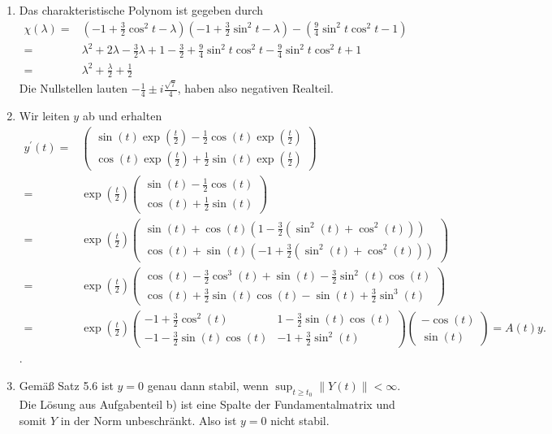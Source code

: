 \begin{solution}
\begin{enumerate}[label = \textbf{\alph*)}]
  \item Das charakteristische Polynom ist gegeben durch
  \begin{align*}
    \chi (\lambda) =& (-1 + \frac{3}{2}\cos^2 t - \lambda)(-1 + \frac{3}{2}\sin^2 t - \lambda) - (\frac{9}{4}\sin^2 t \cos^2 t - 1) \\
    =& \lambda^2 +2\lambda - \frac{3}{2} \lambda + 1 - \frac{3}{2} + \frac{9}{4}\sin^2 t \cos^2 t - \frac{9}{4} \sin^{2} t \cos^2 t + 1 \\
    =& \lambda^2 + \frac{\lambda}{2} + \frac{1}{2}
  \end{align*}
  Die Nullstellen lauten $- \frac{1}{4} \pm i\frac{\sqrt{7}}{4}$, haben also negativen Realteil.
  \item Wir leiten $y$ ab und erhalten
  \begin{align*}
    y^{\prime}(t) =& \begin{pmatrix}
      \sin(t)\exp(\frac{t}{2}) -\frac{1}{2}\cos(t)\exp(\frac{t}{2}) \\ \cos(t)\exp(\frac{t}{2}) + \frac{1}{2}\sin(t)\exp(\frac{t}{2})
    \end{pmatrix} \\
    =& \exp\left(\frac{t}{2}\right) \begin{pmatrix}
      \sin(t) -\frac{1}{2}\cos(t) \\ \cos(t) + \frac{1}{2}\sin(t)
    \end{pmatrix} \\
    =& \exp\left(\frac{t}{2}\right) \begin{pmatrix}
      \sin(t)+\cos(t)(1-\frac{3}{2}(\sin^2(t)+\cos^2(t))) \\
      \cos(t) + \sin(t)(-1+\frac{3}{2}(\sin^2(t)+\cos^2(t)))
    \end{pmatrix} \\
    =& \exp\left(\frac{t}{2}\right) \begin{pmatrix}
      \cos(t)-\frac{3}{2}\cos^3(t)+\sin(t)-\frac{3}{2}\sin^2(t)\cos(t) \\
      \cos(t) +\frac{3}{2}\sin(t)\cos(t)-\sin(t)+\frac{3}{2}\sin^3(t)
    \end{pmatrix} \\
    =& \exp\left(\frac{t}{2}\right)\begin{pmatrix}
      -1 + \frac{3}{2}\cos^2(t) & 1 -\frac{3}{2}\sin(t)\cos(t) \\
      -1 - \frac{3}{2}\sin(t)\cos(t) & -1 + \frac{3}{2}\sin^2(t)
    \end{pmatrix}\begin{pmatrix}
      -\cos(t) \\ \sin(t)
    \end{pmatrix} = A(t)y.
  \end{align*}.
  \item Gemäß Satz 5.6 ist $y = 0$ genau dann stabil, wenn ${\sup}_{t \geq t_0} \| Y(t)\| < \infty$. Die Lösung aus Aufgabenteil b) ist eine Spalte der Fundamentalmatrix und somit $Y$ in der Norm unbeschränkt. Also ist $y= 0$ nicht stabil.
  \end{enumerate}
\end{solution}
